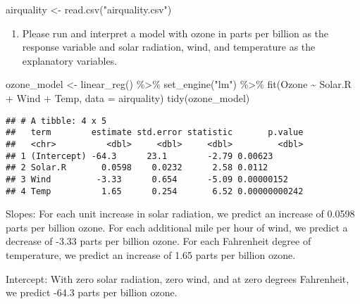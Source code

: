 \documentclass[
]{article}
\newenvironment{Shaded}{\begin{snugshade}}{\end{snugshade}}
\newcommand{\AttributeTok}[1]{\textcolor[rgb]{0.77,0.63,0.00}{#1}}
\newcommand{\FunctionTok}[1]{\textcolor[rgb]{0.00,0.00,0.00}{#1}}
\newcommand{\NormalTok}[1]{#1}
\newcommand{\OtherTok}[1]{\textcolor[rgb]{0.56,0.35,0.01}{#1}}
\newcommand{\SpecialCharTok}[1]{\textcolor[rgb]{0.00,0.00,0.00}{#1}}
\newcommand{\StringTok}[1]{\textcolor[rgb]{0.31,0.60,0.02}{#1}}
\providecommand{\tightlist}{%
  \setlength{\itemsep}{0pt}\setlength{\parskip}{0pt}}
\begin{document}
\begin{Shaded}
\begin{Highlighting}[]
\NormalTok{airquality }\OtherTok{\textless{}{-}} \FunctionTok{read.csv}\NormalTok{(}\StringTok{"airquality.csv"}\NormalTok{)}
\end{Highlighting}
\end{Shaded}

\begin{enumerate}
\def\labelenumi{\arabic{enumi}.}
\setcounter{enumi}{3}
\tightlist
\item
  Please run and interpret a model with ozone in parts per billion as
  the response variable and solar radiation, wind, and temperature as
  the explanatory variables.
\end{enumerate}

\begin{Shaded}
\begin{Highlighting}[]
\NormalTok{ozone\_model }\OtherTok{\textless{}{-}} \FunctionTok{linear\_reg}\NormalTok{() }\SpecialCharTok{\%\textgreater{}\%} 
  \FunctionTok{set\_engine}\NormalTok{(}\StringTok{"lm"}\NormalTok{) }\SpecialCharTok{\%\textgreater{}\%} 
  \FunctionTok{fit}\NormalTok{(Ozone }\SpecialCharTok{\textasciitilde{}}\NormalTok{ Solar.R }\SpecialCharTok{+}\NormalTok{ Wind }\SpecialCharTok{+}\NormalTok{ Temp, }\AttributeTok{data =}\NormalTok{ airquality)}
\FunctionTok{tidy}\NormalTok{(ozone\_model)}
\end{Highlighting}
\end{Shaded}

\begin{verbatim}
## # A tibble: 4 x 5
##   term        estimate std.error statistic       p.value
##   <chr>          <dbl>     <dbl>     <dbl>         <dbl>
## 1 (Intercept) -64.3      23.1        -2.79 0.00623      
## 2 Solar.R       0.0598    0.0232      2.58 0.0112       
## 3 Wind         -3.33      0.654      -5.09 0.00000152   
## 4 Temp          1.65      0.254       6.52 0.00000000242
\end{verbatim}

Slopes: For each unit increase in solar radiation, we predict an
increase of 0.0598 parts per billion ozone. For each additional mile per
hour of wind, we predict a decrease of -3.33 parts per billion ozone.
For each Fahrenheit degree of temperature, we predict an increase of
1.65 parts per billion ozone.

Intercept: With zero solar radiation, zero wind, and at zero degrees
Fahrenheit, we predict -64.3 parts per billion ozone.
\end{document}
